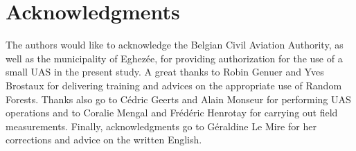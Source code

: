 \documentclass[remotesensing,article,submit,moreauthors,pdftex,12pt,a4paper]{mdpi} %
\begin{document}
\section*{\noindent Acknowledgments}
\vspace{12pt}

The authors would like to acknowledge the Belgian Civil Aviation Authority, as well as the municipality of Eghezée, for providing authorization for the use of a small UAS in the present study. A great thanks to Robin Genuer and Yves Brostaux for delivering training and advices on the appropriate use of Random Forests. Thanks also go to C\'edric Geerts and Alain Monseur for performing UAS operations and to Coralie Mengal and Fr\'ed\'eric Henrotay for carrying out field measurements. Finally, acknowledgments go to G\'eraldine Le Mire %
for her corrections and advice on the written English.



\makeatletter
\renewcommand\@biblabel[1]{#1. }
\makeatother


\end{document}
